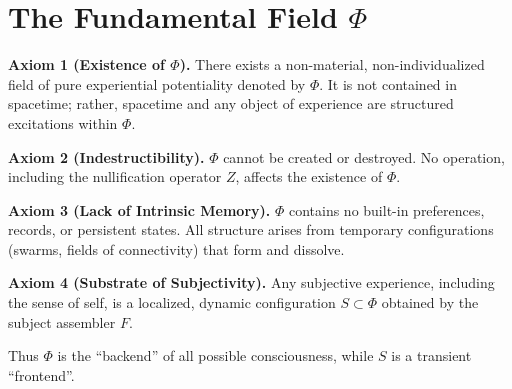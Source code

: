 \documentclass[12pt]{article}
\begin{document}
\section*{The Fundamental Field $\Phi$}

\textbf{Axiom 1 (Existence of $\Phi$).} There exists a non-material, non-individualized field of pure experiential potentiality denoted by $\Phi$. It is not contained in spacetime; rather, spacetime and any object of experience are structured excitations within $\Phi$.

\textbf{Axiom 2 (Indestructibility).} $\Phi$ cannot be created or destroyed. No operation, including the nullification operator $Z$, affects the existence of $\Phi$.

\textbf{Axiom 3 (Lack of Intrinsic Memory).} $\Phi$ contains no built-in preferences, records, or persistent states. All structure arises from temporary configurations (swarms, fields of connectivity) that form and dissolve.

\textbf{Axiom 4 (Substrate of Subjectivity).} Any subjective experience, including the sense of self, is a localized, dynamic configuration $S \subset \Phi$ obtained by the subject assembler $F$.

Thus $\Phi$ is the ``backend'' of all possible consciousness, while $S$ is a transient ``frontend''.
\end{document}
